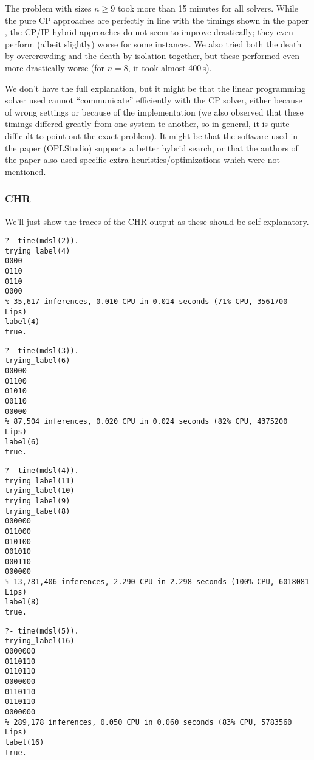 The problem with sizes $n\geq 9$ took more than 15 minutes for all solvers. While the pure CP approaches are perfectly in line with the timings shown in the paper \cite{paper_still2}, the CP/IP hybrid approaches do not seem to improve drastically; they even perform (albeit slightly) worse for some instances. We also tried both the death by overcrowding and the death by isolation together, but these performed even more drastically worse (for $n=8$, it took almost 400\,s).

We don't have the full explanation, but it might be that the linear programming solver used cannot ``communicate'' efficiently with the CP solver, either because of wrong settings or because of the implementation (we also observed that these timings differed greatly from one system te another, so in general, it is quite difficult to point out the exact problem). It might be that the software used in the paper (OPLStudio) supports a better hybrid search, or that the authors of the paper also used specific extra heuristics/optimizations which were not mentioned.
\subsubsection{CHR}
We'll just show the traces of the CHR output as these should be self-explanatory.
\begin{verbatim}
?- time(mdsl(2)).
trying_label(4)
0000
0110
0110
0000
% 35,617 inferences, 0.010 CPU in 0.014 seconds (71% CPU, 3561700 Lips)
label(4)
true.
\end{verbatim}
\begin{verbatim}
?- time(mdsl(3)).
trying_label(6)
00000
01100
01010
00110
00000
% 87,504 inferences, 0.020 CPU in 0.024 seconds (82% CPU, 4375200 Lips)
label(6)
true. 
\end{verbatim}

\begin{verbatim}
?- time(mdsl(4)).
trying_label(11)
trying_label(10)
trying_label(9)
trying_label(8)
000000
011000
010100
001010
000110
000000
% 13,781,406 inferences, 2.290 CPU in 2.298 seconds (100% CPU, 6018081 Lips)
label(8)
true.
\end{verbatim}


\begin{verbatim}
?- time(mdsl(5)).
trying_label(16)
0000000
0110110
0110110
0000000
0110110
0110110
0000000
% 289,178 inferences, 0.050 CPU in 0.060 seconds (83% CPU, 5783560 Lips)
label(16)
true.
\end{verbatim}

